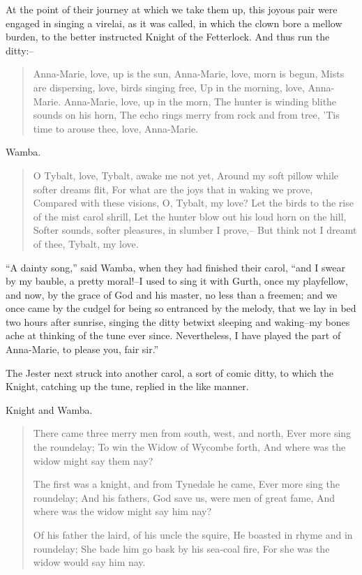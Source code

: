 At the point of their journey at which we take them up, this joyous pair
were engaged in singing a virelai, as it was called, in which the clown
bore a mellow burden, to the better instructed Knight of the Fetterlock.
And thus run the ditty:--

\begin{quote}
Anna-Marie, love, up is the sun,
Anna-Marie, love, morn is begun,
Mists are dispersing, love, birds singing free,
Up in the morning, love, Anna-Marie.
Anna-Marie, love, up in the morn,
The hunter is winding blithe sounds on his horn,
The echo rings merry from rock and from tree,
'Tis time to arouse thee, love, Anna-Marie.
\end{quote}

Wamba.

\begin{quote}
O Tybalt, love, Tybalt, awake me not yet,
Around my soft pillow while softer dreams flit,
For what are the joys that in waking we prove,
Compared with these visions, O, Tybalt, my love?
Let the birds to the rise of the mist carol shrill,
Let the hunter blow out his loud horn on the hill,
Softer sounds, softer pleasures, in slumber I prove,--
But think not I dreamt of thee, Tybalt, my love.
\end{quote}

``A dainty song,'' said Wamba, when they had finished their carol, ``and
I swear by my bauble, a pretty moral!--I used to sing it with Gurth,
once my playfellow, and now, by the grace of God and his master, no less
than a freemen; and we once came by the cudgel for being so entranced by
the melody, that we lay in bed two hours after sunrise, singing the
ditty betwixt sleeping and waking--my bones ache at thinking of the tune
ever since. Nevertheless, I have played the part of Anna-Marie, to
please you, fair sir.''

The Jester next struck into another carol, a sort of comic ditty, to
which the Knight, catching up the tune, replied in the like manner.

Knight and Wamba.

\begin{quote}
There came three merry men from south, west, and north,
Ever more sing the roundelay;
To win the Widow of Wycombe forth,
And where was the widow might say them nay?

The first was a knight, and from Tynedale he came,
Ever more sing the roundelay;
And his fathers, God save us, were men of great fame,
And where was the widow might say him nay?

Of his father the laird, of his uncle the squire,
He boasted in rhyme and in roundelay;
She bade him go bask by his sea-coal fire,
For she was the widow would say him nay.
\end{quote}

